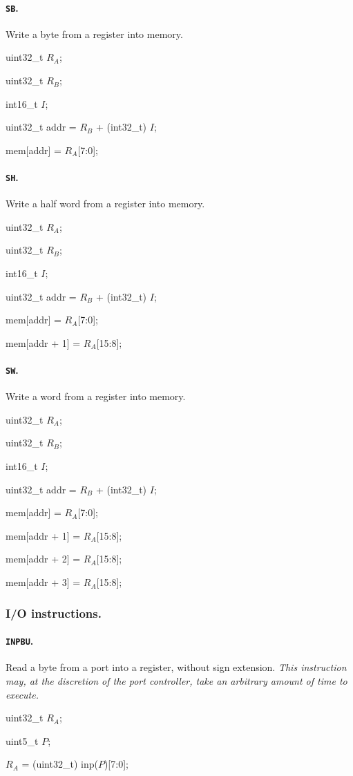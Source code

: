 \documentclass[12pt,english,twoside]{report}
\def\code{\texttt}
\def\subsubsubsection{\paragraph}
\newcommand\incomplete[1]{{\color{red}\it #1}}
\newenvironment{codeblock}
{\begin{list}{}{
\setlength{\rightmargin}{\leftmargin}
\setlength{\listparindent}{0pt}%
\raggedright
\setlength{\itemsep}{0pt}
\setlength{\parsep}{0pt}
\normalfont\ttfamily}%
 \item[]}
{\end{list}}
\begin{document}
\subsubsubsection{\label{sec:Ins_SB}\code{SB}.}
Write a byte from a register into memory.

\begin{codeblock}
  uint32\_t $R_A$;

  uint32\_t $R_B$;

  int16\_t $I$;

  uint32\_t addr = $R_B$ + (int32\_t) $I$;

  mem[addr] = $R_A$[7:0];
\end{codeblock}

\subsubsubsection{\label{sec:Ins_SH}\code{SH}.}
Write a half word from a register into memory.

\begin{codeblock}
  uint32\_t $R_A$;

  uint32\_t $R_B$;

  int16\_t $I$;

  uint32\_t addr = $R_B$ + (int32\_t) $I$;

  mem[addr] = $R_A$[7:0];

  mem[addr + 1] = $R_A$[15:8];
\end{codeblock}

\subsubsubsection{\label{sec:Ins_SW}\code{SW}.}
Write a word from a register into memory.

\begin{codeblock}
  uint32\_t $R_A$;

  uint32\_t $R_B$;

  int16\_t $I$;

  uint32\_t addr = $R_B$ + (int32\_t) $I$;

  mem[addr] = $R_A$[7:0];

  mem[addr + 1] = $R_A$[15:8];

  mem[addr + 2] = $R_A$[15:8];

  mem[addr + 3] = $R_A$[15:8];
\end{codeblock}

\subsubsection{I/O instructions.}

\subsubsubsection{\label{sec:Ins_INPBU}\code{INPBU}.}
Read a byte from a port into a register, without sign extension.
\incomplete{This instruction may, at the discretion of the port
  controller, take an arbitrary amount of time to execute.}

\begin{codeblock}
  uint32\_t $R_A$;
  
  uint5\_t $P$;

  $R_A$ = (uint32\_t) inp($P$)[7:0];
\end{codeblock}
\end{document}
